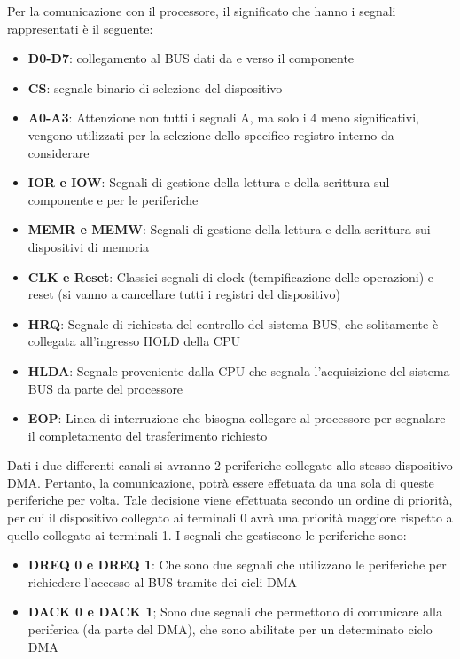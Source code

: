 Per la comunicazione con il processore, il significato che hanno i segnali rappresentati è il seguente:
\begin{itemize}
    \item \textbf{D0-D7}: collegamento al BUS dati da e verso il componente
    \item \textbf{CS}: segnale binario di selezione del dispositivo
    \item \textbf{A0-A3}: Attenzione non tutti i segnali A, ma solo i 4 meno significativi, vengono utilizzati per la selezione dello specifico registro interno da considerare
    \item \textbf{IOR e IOW}: Segnali di gestione della lettura e della scrittura sul componente e per le periferiche
    \item \textbf{MEMR e MEMW}: Segnali di gestione della lettura e della scrittura sui dispositivi di memoria
    \item \textbf{CLK e Reset}: Classici segnali di clock (tempificazione delle operazioni) e reset (si vanno a cancellare tutti i registri del dispositivo)
    \item \textbf{HRQ}: Segnale di richiesta del controllo del sistema BUS, che solitamente è collegata all'ingresso HOLD della CPU
    \item \textbf{HLDA}: Segnale proveniente dalla CPU che segnala l'acquisizione del sistema BUS da parte del processore
    \item  \textbf{EOP}: Linea di interruzione che bisogna collegare al processore per segnalare il completamento del trasferimento richiesto
\end{itemize}

Dati i due differenti canali si avranno 2 periferiche collegate allo stesso dispositivo DMA. Pertanto, la comunicazione, potrà essere effetuata da una sola di queste periferiche per volta. Tale decisione viene effettuata secondo un ordine di priorità, per cui il dispositivo collegato ai terminali 0 avrà una priorità maggiore rispetto a quello collegato ai terminali 1. I segnali che gestiscono le periferiche sono:
\begin{itemize}
    \item \textbf{DREQ 0 e DREQ 1}: Che sono due segnali che utilizzano le periferiche per richiedere l'accesso al BUS tramite dei cicli DMA
    \item \textbf{DACK 0 e DACK 1}; Sono due segnali che permettono di comunicare alla periferica (da parte del DMA), che sono abilitate per un determinato ciclo DMA
\end{itemize}

